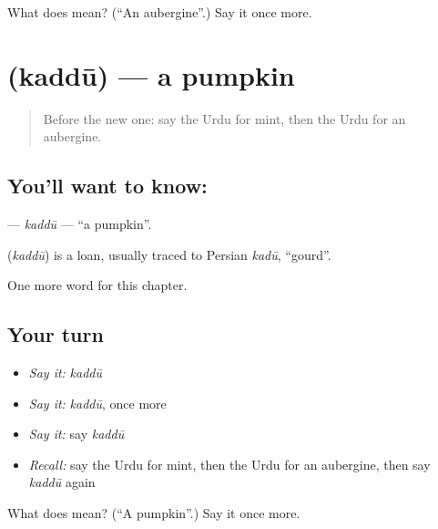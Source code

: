 \begin{tcolorbox}[breakable,colback=teal!4,colframe=teal!35!black,title={Before you move on}]
What does  mean? (\textquotedblleft{}An aubergine\textquotedblright{}.) Say it once more.
\end{tcolorbox}
\section[\texorpdfstring{\ur{کدو} (kaddū)}{کدو (kaddū)}]{ (kaddū) — a pumpkin}

\label{lesson:UR-C226-kaddu}



\begin{quote}
Before the new one: say the Urdu for mint, then the Urdu for an aubergine.
\end{quote}

\subsection*{You'll want to know: }
\textbf{} — \emph{kaddū} — \textquotedblleft{}a pumpkin\textquotedblright{}.

\begin{cousinweb}
\textbf{} (\emph{kaddū}) is a loan, usually traced to Persian \emph{kadū}, \textquotedblleft{}gourd\textquotedblright{}.
\end{cousinweb}

\begin{grammarlens}[title={What you've built}]
One more word for this chapter.
\end{grammarlens}

\subsection*{Your turn}
\begin{itemize}
\raggedright
  \item \emph{Say it:} \emph{kaddū}
  \item \emph{Say it:} \emph{kaddū}, once more
  \item \emph{Say it:} say \emph{kaddū}
  \item \emph{Recall:} say the Urdu for mint, then the Urdu for an aubergine, then say \emph{kaddū} again
\end{itemize}

\begin{tcolorbox}[breakable,colback=teal!4,colframe=teal!35!black,title={Before you move on}]
What does  mean? (\textquotedblleft{}A pumpkin\textquotedblright{}.) Say it once more.
\end{tcolorbox}
